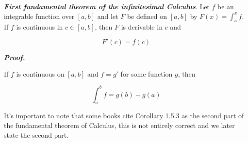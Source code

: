 \documentclass{report}
\begin{document}

    \begin{thBox}
        \textit{\textbf{First fundamental theorem of the infinitesimal Calculus}}. Let $f$ be an integrable function over $[a,b]$ and let $F$ be defined on $[a,b]$ by $F(x) = \int_{a}^{x}f$.\\
        If $f$ is continuous in $c \in [a,b]$, then $F$ is derivable in $c$ and

        $$F'(c) = f(c)$$
    \end{thBox}

    \textit{\textbf{Proof.}}

    \begin{corBox}
        If $f$ is continuous on $[a,b]$ and $f = g'$ for some function $g$, then

        $$\int_{a}^{b}f = g(b) - g(a)$$
    \end{corBox}

    \begin{noteBox}
        It's important to note that some books cite Corollary 1.5.3 as the second part of the fundamental theorem of Calculus, this is not entirely correct and we later state the second part.
    \end{noteBox}

    
\end{document}
